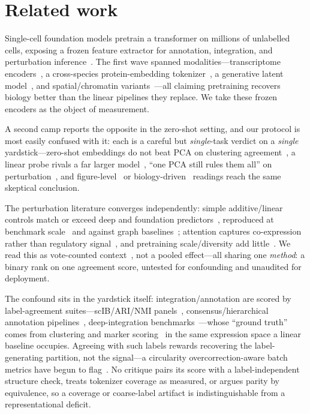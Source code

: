\documentclass[journal]{IEEEtran}
\begin{document}

\section{Related work}

Single-cell foundation models pretrain a transformer on millions of unlabelled cells, exposing a frozen feature extractor for annotation, integration, and perturbation inference~\cite{bommasani2021,vaswani2017}. The first wave spanned modalities---transcriptome encoders~\cite{scgpt2024,geneformer2023,scfoundation2024}, a cross-species protein-embedding tokenizer~\cite{uce2023}, a generative latent model~\cite{cellplm2024}, and spatial/chromatin variants~\cite{nicheformer2025,chromfound2025,atacformer2024,epifoundation2025}---all claiming pretraining recovers biology better than the linear pipelines they replace. We take these frozen encoders as the object of measurement.

A second camp reports the opposite in the zero-shot setting, and our protocol is most easily confused with it: each is a careful but \emph{single}-task verdict on a \emph{single} yardstick---zero-shot embeddings do not beat PCA on clustering agreement~\cite{kedzierska2025}, a linear probe rivals a far larger model~\cite{boiarsky2024}, ``one PCA still rules them all'' on perturbation~\cite{bendidi2024}, and figure-level~\cite{atti2025} or biology-driven~\cite{wu2025} readings reach the same skeptical conclusion.

The perturbation literature converges independently: simple additive/linear controls match or exceed deep and foundation predictors~\cite{wongpfizer2025,kernfeld2025,csendes2025,ahlmann2025}, reproduced at benchmark scale~\cite{perteval2024,scperturbench2025,systema2026} and against graph baselines~\cite{roohani2024}; attention captures co-expression rather than regulatory signal~\cite{kendiukhov2026}, and pretraining scale/diversity add little~\cite{denadel2026}. We read this as vote-counted context~\cite{borenstein2009}, not a pooled effect---all sharing one \emph{method}: a binary rank on one agreement score, untested for confounding and unaudited for deployment.

The confound sits in the yardstick itself: integration/annotation are scored by label-agreement suites---scIB/ARI/NMI panels~\cite{luecken2022}, consensus/hierarchical annotation pipelines~\cite{popv2024,hce2026}, deep-integration benchmarks~\cite{scibe2025}---whose ``ground truth'' comes from clustering and marker scoring~\cite{wolf2018scanpy,stuart2019seurat} in the same expression space a linear baseline occupies. Agreeing with such labels rewards recovering the label-generating partition, not the signal---a circularity overcorrection-aware batch metrics have begun to flag~\cite{rbet2025}. No critique pairs its score with a label-independent structure check, treats tokenizer coverage as measured, or argues parity by equivalence, so a coverage or coarse-label artifact is indistinguishable from a representational deficit.
\end{document}
